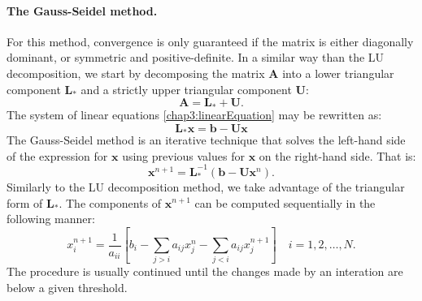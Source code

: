 \paragraph*{The Gauss-Seidel method.}
For this method, convergence is only guaranteed if the matrix is either diagonally dominant, or symmetric and positive-definite. In a similar way than the LU decomposition, we start by decomposing the matrix $ \mathbf{A} $ into a lower triangular component $ \mathbf{L}_ {*} $ and a strictly upper triangular component $ \mathbf{U} $:
\begin{equation}
\mathbf{A} = \mathbf{L}_{*} + \mathbf{U}.
\end{equation}
The system of linear equations \eqref{chap3:linearEquation} may be rewritten as:
\begin{equation}
\mathbf{L}_{*} \mathbf{x} = \mathbf{b} - \mathbf{U} \mathbf{x}
\end{equation}
The Gauss-Seidel method is an iterative technique that solves the left-hand side of the expression for $ \mathbf{x} $ using previous values for $ \mathbf{x} $ on the right-hand side. That is:
\begin{equation}
\mathbf{x}^{n+1} = \mathbf{L}_{*}^{-1} (\mathbf{b} - \mathbf{U} \mathbf{x}^n).
\end{equation}
Similarly to the LU decomposition method, we take advantage of the triangular form of $ \mathbf{L}_{*} $. The components of $ \mathbf{x}^{n+1} $ can be computed sequentially in the following manner:
\begin{equation}
x_i^{n+1} = \dfrac{1}{a_{ii}} \left[ b_i - \sum_{j>i} a_{ij} x_j^n -\sum_{j<i} a_{ij} x_j^{n+1} \right] \quad i = 1, 2, \ldots, N.
\end{equation}
The procedure is usually continued until the changes made by an interation are below a given threshold. 


